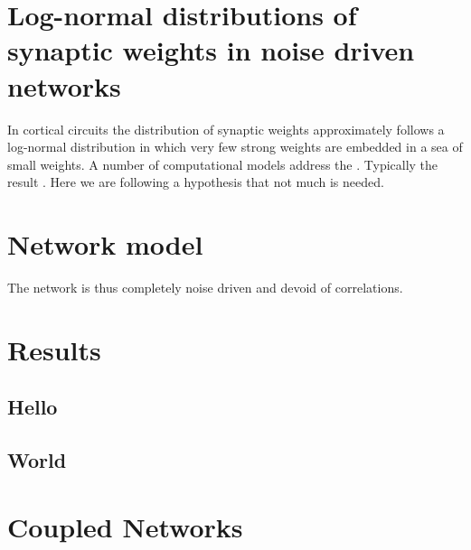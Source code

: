 \section*{\LARGE Log-normal distributions of synaptic weights in noise driven networks}

In cortical circuits the distribution of synaptic weights approximately follows a log-normal distribution in which very few strong weights are embedded in a sea of small weights. A number of computational models address the . Typically the result . Here we are following a hypothesis that not much is needed.


\section*{Network model}

The network is thus completely noise driven and devoid of correlations.



\section*{Results}

\subsection*{Hello}

\subsection*{World}



\section*{Coupled Networks}

